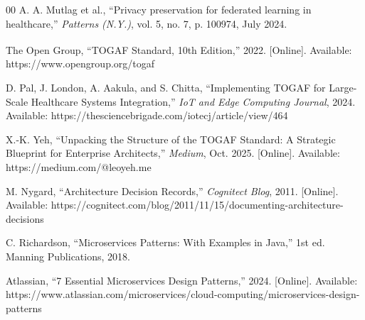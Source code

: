 \documentclass[conference]{IEEEtran}
\begin{document}
\begin{thebibliography}{00}
A. A. Mutlag et al.,
``Privacy preservation for federated learning in healthcare,''
\textit{Patterns (N.Y.)}, vol. 5, no. 7, p. 100974, July 2024.

The Open Group,
``TOGAF\textsuperscript{\textregistered} Standard, 10th Edition,'' 2022. [Online].
Available: https://www.opengroup.org/togaf

D. Pal, J. London, A. Aakula, and S. Chitta,
``Implementing TOGAF for Large-Scale Healthcare Systems Integration,''
\textit{IoT and Edge Computing Journal}, 2024.
Available: https://thesciencebrigade.com/iotecj/article/view/464

X.-K. Yeh,
``Unpacking the Structure of the TOGAF Standard: A Strategic Blueprint for
Enterprise Architects,'' \textit{Medium}, Oct. 2025. [Online].
Available: https://medium.com/@leoyeh.me

M. Nygard,
``Architecture Decision Records,'' \textit{Cognitect Blog}, 2011. [Online].
Available: https://cognitect.com/blog/2011/11/15/documenting-architecture-decisions

C. Richardson,
``Microservices Patterns: With Examples in Java,'' 1st ed.
Manning Publications, 2018.

Atlassian,
``7 Essential Microservices Design Patterns,'' 2024. [Online].
Available: https://www.atlassian.com/microservices/cloud-computing/microservices-design-patterns

\end{thebibliography}
\end{document}
